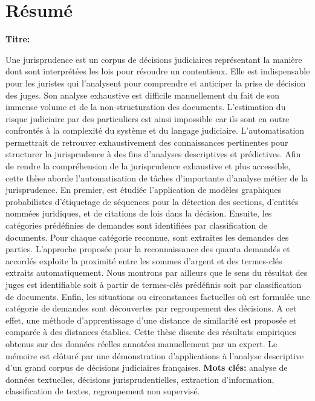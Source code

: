\chapter*{Résumé}
\textbf{Titre:} \textsc{\titlefr}

Une jurisprudence est un corpus de décisions judiciaires représentant la manière dont sont interprétées les lois pour résoudre un contentieux. Elle est indispensable pour les juristes qui l'analysent pour comprendre et anticiper la prise de décision des juges. Son analyse exhaustive est difficile manuellement du fait de son immense volume et de la non-structuration des documents. L'estimation du risque judiciaire par des particuliers est ainsi impossible car ils sont en outre confrontés à la complexité du système et du langage judiciaire. L'automatisation permettrait de retrouver exhaustivement des connaissances pertinentes pour structurer la jurisprudence à des fins d'analyses descriptives et prédictives.  
Afin de rendre la compréhension de la jurisprudence exhaustive et plus accessible, cette thèse aborde l'automatisation de tâches d'importante  d'analyse métier de la jurisprudence. En premier, est étudiée l'application de modèles graphiques probabilistes d'étiquetage de séquences pour la détection des sections, d'entités nommées juridiques, et de citations de lois dans la décision. Ensuite, les catégories prédéfinies de demandes sont identifiées par classification de documents. Pour chaque catégorie reconnue, sont extraites les demandes des parties.  L'approche proposée pour la reconnaissance des quanta demandés et accordés exploite la proximité entre les sommes d'argent et des termes-clés extraits automatiquement. Nous montrons par ailleurs que le sens du résultat des juges est identifiable soit à partir de termes-clés prédéfinis soit par classification de documents. Enfin, les situations ou circonstances factuelles où est formulée une catégorie de demandes sont découvertes par regroupement des décisions. A cet effet, une méthode d'apprentissage d'une distance de similarité est proposée et comparée à des distances établies.
Cette thèse discute des résultats empiriques obtenus sur des données réelles annotées manuellement par un expert. Le mémoire est clôturé par une démonstration d'applications à l'analyse descriptive d'un grand corpus de décisions judiciaires françaises.
\newline
\textbf{Mots clés:} analyse de données textuelles, décisions jurisprudentielles, extraction d'information, classification de textes, regroupement non supervisé.

